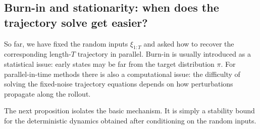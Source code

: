 \documentclass[11pt]{article}
\newif\ifshowsolutions
\newcommand{\SolutionBox}[2][10]{%
  \ifshowsolutions
    \begin{tcolorbox}[stat221panelgray,title={Solution}]
    #2
    \end{tcolorbox}
  \else
    \begin{tcolorbox}[stat221panelgray,unbreakable,title={Workspace}]
    \vspace{#1\baselineskip}
    \end{tcolorbox}
  \fi
}
\begin{document}
\SolutionBox[14]{%
\begin{enumerate}[leftmargin=*]
  \item Define $g_t := \1\{u_t \le \alpha(x_{t-1},\tilde x_t)\} \in \{0,1\}$.
  Then \eqref{eq:accept-reject} is equivalent to
  \[
  x_t = g_t \tilde x_t + (1-g_t)x_{t-1}.
  \]
  Indeed, if $g_t=1$ (accept) this gives $x_t=\tilde x_t$, and if $g_t=0$ (reject) it gives $x_t=x_{t-1}$.
  \item The map $x_{t-1}\mapsto g_t$ contains an indicator of an inequality.
  Unless $\alpha(x_{t-1},\tilde x_t)$ is constant in $x_{t-1}$ (a degenerate case), the set where $g_t$ flips from $0$ to $1$ is a decision boundary, across which $g_t$ jumps discontinuously.
  Since $x_t$ depends on $g_t$, the overall map $x_{t-1}\mapsto x_t$ is typically discontinuous in its derivative (and often discontinuous in the function itself when $\tilde x_t$ depends on $x_{t-1}$), so it is not differentiable everywhere.
  \item One option is a logistic (soft) gate with temperature $\tau>0$:
  \[
    \tilde g_t := \sigma\!\left(\frac{\log \alpha(x_{t-1},\tilde x_t) - \log u_t}{\tau}\right)\in(0,1),
  \]
  where $\sigma(s)=1/(1+e^{-s})$.
  As $\tau\downarrow 0$, $\tilde g_t$ becomes a sharper approximation to the hard gate $\1\{\log \alpha - \log u_t \ge 0\}$.
  In an inexact Gauss--Newton implementation one would keep the forward update using the true hard gate $g_t$, but use $\tilde g_t$ (or its Jacobian contribution) when forming an approximate Jacobian for the Gauss--Newton step.%
\end{enumerate}
}

\clearpage
\subsection{Burn-in and stationarity: when does the trajectory solve get easier?}
\label{subsec:burnin-stationarity}

So far, we have fixed the random inputs $\xi_{1:T}$ and asked how to recover the corresponding length-$T$ trajectory in parallel.
Burn-in is usually introduced as a statistical issue: early states may be far from the target distribution $\pi$.
For parallel-in-time methods there is also a computational issue: the difficulty of solving the fixed-noise trajectory equations depends on how perturbations propagate along the rollout.

The next proposition isolates the basic mechanism.
It is simply a stability bound for the deterministic dynamics obtained after conditioning on the random inputs.
\end{document}
